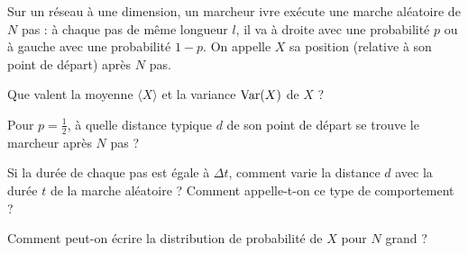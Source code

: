 Sur un réseau à une dimension, un marcheur ivre exécute une marche aléatoire de $N$ pas : à chaque pas de même longueur $l$, il va à droite avec une probabilité $p$ ou à gauche avec une probabilité $1-p$. On appelle $X$ sa position (relative à son point de départ) après $N$ pas.

\medskip

\question
Que valent la moyenne $\langle X \rangle$ et la variance ${\rm Var}(X)$ de $X$ ?

\question
Pour $p=\frac{1}{2}$, à quelle distance typique $d$ de son point de départ se trouve le marcheur après $N$ pas ? 

\question
Si la durée de chaque pas est égale à $\Delta t$, comment varie la distance $d$ avec la durée $t$ de la marche aléatoire ? Comment appelle-t-on ce type de comportement ?

\question
Comment peut-on écrire la distribution de probabilité de $X$ pour $N$ grand ?

